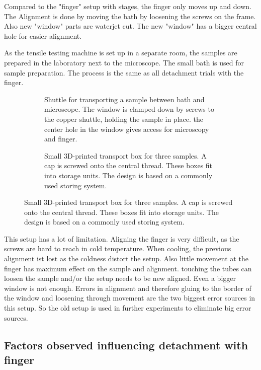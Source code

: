 
Compared to the "finger" setup with stages, the finger only moves up and down. The Alignment is done by moving the bath by loosening the screws on the frame. Also new "window" parts are waterjet cut. The new "window" has a bigger central hole for easier alignment.

As the tensile testing machine is set up in a separate room, the samples are prepared in the laboratory next to the microscope. The small bath is used for sample preparation. The process is the same as all detachment trials with the finger. 

\begin{figure}[hbt!]
	\centering
	\begin{subfigure}[]{0.45\textwidth}
		\centering
		
		\caption{Shuttle for transporting a sample between bath and microscope. The window is clamped down by screws to the copper shuttle, holding the sample in place. the center hole in the window gives access for microscopy and finger.}
		\label{fig:shuttle}
	\end{subfigure}
	\begin{subfigure}[]{0.45\textwidth}
		\centering
		
		\caption{Small 3D-printed transport box for three samples. A cap is screwed onto the central thread. These boxes fit into storage units. The design is based on a commonly used storing system.\newline\newline}
		\label{fig:transportbox}
	\end{subfigure}
	\label{fig:shuttleandtransportbox}
\end{figure}

This setup has a lot of limitation. Aligning the finger is very difficult, as the screws are hard to reach in cold temperature. When cooling, the previous alignment ist lost as the coldness distort the setup. Also little movement at the finger has maximum effect on the sample and alignment. touching the tubes can loosen the sample and/or the setup needs to be new aligned. Even a bigger window is not enough. Errors in alignment and therefore gluing to the border of the window and loosening through movement are the two biggest error sources in this setup. So the old setup is used in further experiments to eliminate big error sources.

\subsection{Factors observed influencing detachment with finger}


